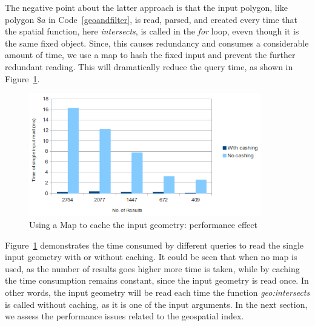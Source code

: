 \documentclass[a4paper,12pt]{article}
\begin{document}
The negative point about the latter approach is that the input polygon, like polygon $\$a$ in Code~\ref{geoandfilter}, is read, parsed, and created every time that the spatial function, here \textit{intersects}, is called in the \textit{for} loop, evevn though it is the same fixed object. Since, this causes redundancy and consumes a considerable amount of time, we use a map to hash the fixed input and prevent the further redundant reading. This will dramatically reduce the query time, as shown in Figure~\ref{figMap}.
 \begin{figure}
\centering
\includegraphics[width=0.9\textwidth]{MapIndexing}
\caption{Using a Map to cache the input geometry: performance effect}
\label{figMap}
\end{figure}

Figure~\ref{figMap} demonstrates the time consumed by different queries to read the single input geometry with or without caching. It could be seen that when no map is used, as the number of results goes higher more time is taken, while by caching the time consumption remains constant, since the input geometry is read once. In other words, the input geometry will be read each time the function \textit{geo:intersects} is called without caching, as it is one of the input arguments. In the next section, we assess the performance issues related to the geospatial index.
\end{document}
